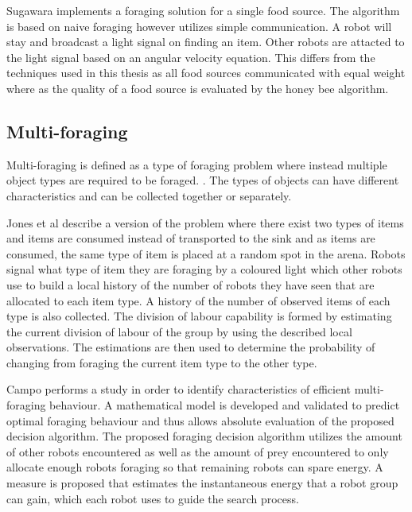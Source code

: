 Sugawara \cite{sugawara2002swarming} implements a foraging solution for a single food source. The algorithm is based on naive foraging however utilizes simple communication. A robot will stay and broadcast a light signal on finding an item. Other robots are attacted to the light signal based on an angular velocity equation. This differs from the techniques used in this thesis as all food sources communicated with equal weight where as the quality of a food source is evaluated by the honey bee algorithm.

\subsection{Multi-foraging}
\label{multiforaging}
Multi-foraging is defined as a type of foraging problem where instead multiple object types are required to be foraged. \cite{Balch99rewardand}. The types of objects can have different characteristics and can be collected together or separately.

Jones et al \cite{jones2003adaptive} describe a version of the problem where there exist two types of items and items are consumed instead of transported to the sink and as items are consumed, the same type of item is placed at a random spot in the arena. Robots signal what type of item they are foraging by a coloured light which other robots use to build a local history of the number of robots they have seen that are allocated to each item type. A history of the number of observed items of each type is also collected. The division of labour capability is formed by estimating the current division of labour of the group by  using the described local observations. The estimations are then used to determine the probability of changing from foraging the current item type to the other type. 


Campo \cite{campo2007efficient} performs a study in order to identify characteristics of efficient multi-foraging behaviour.  A mathematical model is developed and validated to predict optimal foraging behaviour and thus allows absolute evaluation of the proposed decision algorithm. The proposed foraging decision algorithm utilizes the amount of other robots encountered as well as the amount of prey encountered to only allocate enough robots foraging  so that remaining robots can spare energy. A measure is proposed that estimates the instantaneous energy that a robot group can gain, which each robot uses to guide the search process. 

